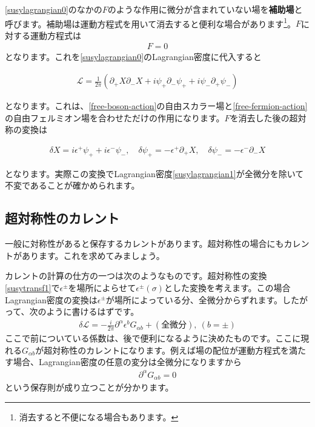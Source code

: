 \documentclass[report,paper=a4, fontsize=12pt, line_length=16cm, number_of_lines=34,dvipdfmx]{jlreq}
\newenvironment{important}{\begin{tcolorbox}[
  colback = white,
  colframe = red!35,
  boxrule = 2mm,
  fonttitle = \bfseries,
  after = \noindent] }{\end{tcolorbox}}
\numberwithin{equation}{chapter}
\numberwithin{equation}{section}
\newcommand{\del}{\partial}
\newcommand{\kyou}[1]{{\sffamily \bfseries #1}}
\newcommand{\Lcal}{\mathcal{L}}
\begin{document}
\eqref{susylagrangian0}のなかの$F$のような作用に微分が含まれていない場を\kyou{補助場}と呼びます。補助場は運動方程式を用いて消去すると便利な場合があります\footnote{消去すると不便になる場合もあります。}。$F$に対する運動方程式は
\begin{align}
  F=0
\end{align}
となります。これを\eqref{susylagrangian0}のLagrangian密度に代入すると
\begin{important}
\begin{align}
  \Lcal=\frac{1}{2\pi}\left( 
    \del_{+}X\del_{-}X+i\psi_{+}\del_{-}\psi_{+}+i\psi_{-}\del_{+}\psi_{-}
   \right)\label{susylagrangian1}
\end{align}
\end{important}
となります。これは、\eqref{free-boson-action}の自由スカラー場と\eqref{free-fermion-action}の自由フェルミオン場を合わせただけの作用になります。$F$を消去した後の超対称の変換は
\begin{important}
  \begin{align}
  \delta X=i\epsilon^{+}\psi_{+}+i\epsilon^{-}\psi_{-} ,\quad
  \delta \psi_{+}=-\epsilon^{+}\del_{+}X,\quad
  \delta \psi_{-}=-\epsilon^{-}\del_{-}X
  \label{susytransf1}
\end{align}
\end{important}
となります。実際この変換でLagrangian密度\eqref{susylagrangian1}が全微分を除いて不変であることが確かめられます。

\subsection{超対称性のカレント}
一般に対称性があると保存するカレントがあります。超対称性の場合にもカレントがあります。これを求めてみましょう。

カレントの計算の仕方の一つは次のようなものです。超対称性の変換\eqref{susytransf1}で$\epsilon^{\pm}$を場所によらせて$\epsilon^{\pm}(\sigma)$とした変換を考えます。この場合Lagrangian密度の変換は$\epsilon^{\pm}$が場所によっている分、全微分からずれます。したがって、次のように書けるはずです。
\begin{align}
  \delta \Lcal =-\frac{i}{2\pi}\del^{\alpha}\epsilon^{b}G_{\alpha b}+(\text{全微分}),\ (b=\pm)
\end{align}
ここで前についている係数は、後で便利になるように決めたものです。ここに現れる$G_{\alpha b}$が超対称性のカレントになります。例えば場の配位が運動方程式を満たす場合、Lagrangian密度の任意の変分は全微分になりますから
\begin{align}
  \del^{\alpha}G_{\alpha b}=0
\end{align}
という保存則が成り立つことが分かります。
\end{document}
